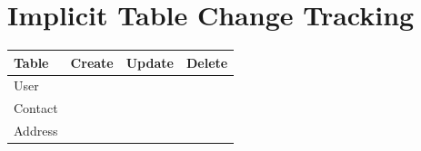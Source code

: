 \part{Implicit Table Change Tracking}
\begin{small}
\begin{tabular}{ p{5cm} c c c }
\textbf{Table} & \textbf{Create} & \textbf{Update} & \textbf{Delete} \\ \hline 
User &  &  &  \\ 
Contact &  &  &  \\ 
Address &  &  &  \\ 
\end{tabular}
\end{small}
